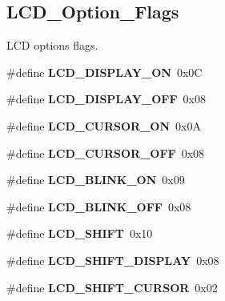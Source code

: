 \subsection*{L\-C\-D\-\_\-\-Option\-\_\-\-Flags}
\label{_amgrp86d47329ce28df2828ae1fd2cea4cd1f}%
L\-C\-D options flags. \begin{DoxyCompactItemize}
\item 
\hypertarget{group__lcd__h_ga846dac5d1bb72bef7a76ee110c0445b6}{\#define {\bfseries L\-C\-D\-\_\-\-D\-I\-S\-P\-L\-A\-Y\-\_\-\-O\-N}~0x0\-C}\label{group__lcd__h_ga846dac5d1bb72bef7a76ee110c0445b6}

\item 
\hypertarget{group__lcd__h_gab1b96426e59139b68ae95df45d697087}{\#define {\bfseries L\-C\-D\-\_\-\-D\-I\-S\-P\-L\-A\-Y\-\_\-\-O\-F\-F}~0x08}\label{group__lcd__h_gab1b96426e59139b68ae95df45d697087}

\item 
\hypertarget{group__lcd__h_ga8dae7021acb10d4e5f8458a5fba78729}{\#define {\bfseries L\-C\-D\-\_\-\-C\-U\-R\-S\-O\-R\-\_\-\-O\-N}~0x0\-A}\label{group__lcd__h_ga8dae7021acb10d4e5f8458a5fba78729}

\item 
\hypertarget{group__lcd__h_ga7a6a930d205b2819be910af194576dca}{\#define {\bfseries L\-C\-D\-\_\-\-C\-U\-R\-S\-O\-R\-\_\-\-O\-F\-F}~0x08}\label{group__lcd__h_ga7a6a930d205b2819be910af194576dca}

\item 
\hypertarget{group__lcd__h_ga654ab1d84354662d394a62be3b2230d1}{\#define {\bfseries L\-C\-D\-\_\-\-B\-L\-I\-N\-K\-\_\-\-O\-N}~0x09}\label{group__lcd__h_ga654ab1d84354662d394a62be3b2230d1}

\item 
\hypertarget{group__lcd__h_ga3480b863e1e145d9a258de170fc44ffa}{\#define {\bfseries L\-C\-D\-\_\-\-B\-L\-I\-N\-K\-\_\-\-O\-F\-F}~0x08}\label{group__lcd__h_ga3480b863e1e145d9a258de170fc44ffa}

\item 
\hypertarget{group__lcd__h_ga921b50a756949abc5a25094b0c191a10}{\#define {\bfseries L\-C\-D\-\_\-\-S\-H\-I\-F\-T}~0x10}\label{group__lcd__h_ga921b50a756949abc5a25094b0c191a10}

\item 
\hypertarget{group__lcd__h_gae8ef8c05d43d77d16e131eb718ae4ac7}{\#define {\bfseries L\-C\-D\-\_\-\-S\-H\-I\-F\-T\-\_\-\-D\-I\-S\-P\-L\-A\-Y}~0x08}\label{group__lcd__h_gae8ef8c05d43d77d16e131eb718ae4ac7}

\item 
\hypertarget{group__lcd__h_ga7bd7034ad5f552265a6baefeb79f9c5b}{\#define {\bfseries L\-C\-D\-\_\-\-S\-H\-I\-F\-T\-\_\-\-C\-U\-R\-S\-O\-R}~0x02}\label{group__lcd__h_ga7bd7034ad5f552265a6baefeb79f9c5b}


\end{DoxyCompactItemize}
